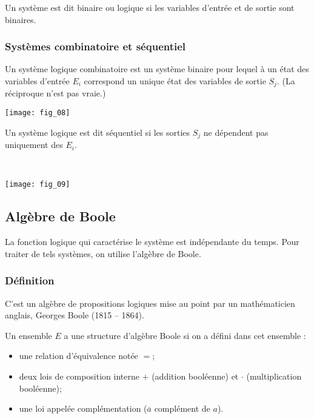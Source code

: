 \begin{defi}
Un système est dit binaire ou logique si les variables d'entrée et de sortie sont binaires. 
\end{defi}

\subsubsection{Systèmes combinatoire et séquentiel}
\begin{defi}
Un système logique combinatoire est un système binaire pour lequel à un état des variables d'entrée $E_i$ correspond un unique état des variables de sortie $S_j$. (La réciproque n'est pas vraie.)
\end{defi}

\begin{center}
\texttt{[image: fig\_08]}
\end{center}

\begin{defi}
Un système logique est dit séquentiel si les sorties $S_j$ ne dépendent pas uniquement des $E_i$.
\end{defi}

\begin{exemple} ~\\

\begin{center}
\texttt{[image: fig\_09]}
\end{center}

\end{exemple}


\subsection{Algèbre de Boole}

La fonction logique qui caractérise le système est indépendante du temps. Pour traiter de tels systèmes, on utilise l'algèbre de Boole. 

\subsubsection{Définition}
C'est un algèbre de propositions logiques mise au point par un mathématicien anglais, Georges Boole (1815 -- 1864).

\begin{defi}
Un ensemble $E$ a une structure d'algèbre Boole si on a défini dans cet ensemble :
\begin{itemize}
\item une relation d'équivalence notée $=$;
\item deux lois de composition interne $+$ (addition booléenne) et $\cdot$ (multiplication booléenne);
\item une loi appelée complémentation ($\overline{a}$ complément de $a$).
\end{itemize}
\end{defi}

